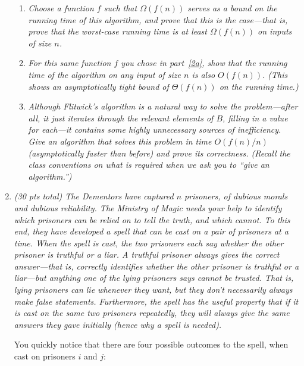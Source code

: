 \documentclass[12pt]{article}
\begin{document}
\begin{enumerate}
	\begin{enumerate}
	\item {\itshape \label{2a} Choose a function $f$ such that $\Omega(f(n))$ serves as a bound on the running time of this algorithm, and prove that this is the case---that is, prove that the worst-case running time is at least $\Omega(f(n))$ on inputs of size $n$. }
	\pagebreak	

	\item {\itshape \label{2b} For this same function $f$ you chose in part~\ref{2a}, show that the running time of the algorithm on any input of size $n$ is also $O(f(n))$. (This shows an asymptotically tight bound of $\Theta(f(n))$ on the running time.)}
\pagebreak
	
	\item {\itshape \label{2c} Although Flitwick's algorithm is a natural way to solve the problem---after all, it just iterates through the relevant elements of $B$, filling in a value for each---it contains some highly unnecessary sources of inefficiency. Give an algorithm that solves this problem in time $O(f(n)/n)$ (asymptotically faster than before) and prove its correctness. (Recall the class conventions on what is required when we ask you to ``give an algorithm.'') }
		\pagebreak
		\end{enumerate}
		
	\item {\itshape (30 pts total) 
	The Dementors have captured $n$ prisoners, of dubious morals and dubious reliability. The Ministry of Magic needs your help to identify which prisoners can be relied on to tell the truth, and which cannot. To this end, they have developed a spell that can be cast on a pair of prisoners at a time. When the spell is cast, the two prisoners each say whether the other prisoner is truthful or a liar. A truthful prisoner always gives the correct answer---that is, correctly identifies whether the \emph{other} prisoner is truthful or a liar---but anything one of the lying prisoners says cannot be trusted. That is, lying prisoners can lie whenever they want, but they \emph{don't} necessarily always make false statements. Furthermore, the spell has the useful property that if it is cast on the same two prisoners repeatedly, they will always give the same answers they gave initially (hence why a spell is needed).
	
	You quickly notice that there are four possible outcomes to the spell, when cast on prisoners $i$ and $j$:


}
\end{enumerate}
\end{document}
